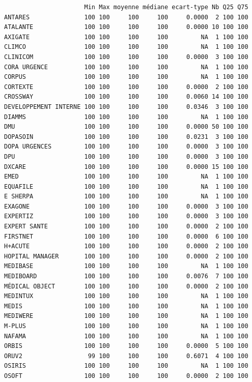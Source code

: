 \documentclass[]{article}
\begin{document}
\begin{verbatim}
                      Min Max moyenne médiane ecart-type Nb Q25 Q75
ANTARES               100 100     100     100     0.0000  2 100 100
ATALANTE              100 100     100     100     0.0000 10 100 100
AXIGATE               100 100     100     100         NA  1 100 100
CLIMCO                100 100     100     100         NA  1 100 100
CLINICOM              100 100     100     100     0.0000  3 100 100
CORA URGENCE          100 100     100     100         NA  1 100 100
CORPUS                100 100     100     100         NA  1 100 100
CORTEXTE              100 100     100     100     0.0000  2 100 100
CROSSWAY              100 100     100     100     0.0060 14 100 100
DEVELOPPEMENT INTERNE 100 100     100     100     0.0346  3 100 100
DIAMMS                100 100     100     100         NA  1 100 100
DMU                   100 100     100     100     0.0000 50 100 100
DOPASOIN              100 100     100     100     0.0231  3 100 100
DOPA URGENCES         100 100     100     100     0.0000  3 100 100
DPU                   100 100     100     100     0.0000  3 100 100
DXCARE                100 100     100     100     0.0000 15 100 100
EMED                  100 100     100     100         NA  1 100 100
EQUAFILE              100 100     100     100         NA  1 100 100
E SHERPA              100 100     100     100         NA  1 100 100
EXAGONE               100 100     100     100     0.0000  3 100 100
EXPERTIZ              100 100     100     100     0.0000  3 100 100
EXPERT SANTE          100 100     100     100     0.0000  2 100 100
FIRSTNET              100 100     100     100     0.0000  6 100 100
H+ACUTE               100 100     100     100     0.0000  2 100 100
HOPITAL MANAGER       100 100     100     100     0.0000  2 100 100
MEDIBASE              100 100     100     100         NA  1 100 100
MEDIBOARD             100 100     100     100     0.0076  7 100 100
MÉDICAL OBJECT        100 100     100     100     0.0000  2 100 100
MEDINTUX              100 100     100     100         NA  1 100 100
MEDIS                 100 100     100     100         NA  1 100 100
MEDIWERE              100 100     100     100         NA  1 100 100
M-PLUS                100 100     100     100         NA  1 100 100
NAFAMA                100 100     100     100         NA  1 100 100
ORBIS                 100 100     100     100     0.0000  5 100 100
ORUV2                  99 100     100     100     0.6071  4 100 100
OSIRIS                100 100     100     100         NA  1 100 100
OSOFT                 100 100     100     100     0.0000  2 100 100

\end{verbatim}
\end{document}
